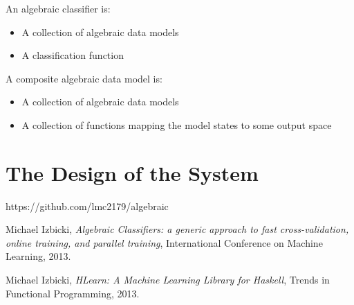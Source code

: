 \documentclass{article}
\begin{document}
\begin{mydef}
An algebraic classifier is:
\begin{itemize}  
    \item A collection of algebraic data models
    \item A classification function
\end{itemize}
\end{mydef}


\begin{mydef}
A composite algebraic data model is: 
\begin{itemize}  
    \item A collection of algebraic data models
    \item A collection of functions mapping the model states to some output space
\end{itemize}
\end{mydef}



\section{The Design of the System}

\begin{thebibliography}{9}

  https://github.com/lmc2179/algebraic
  
  Michael Izbicki,
  \emph{Algebraic Classifiers: a generic approach to fast cross-validation, online training, and parallel training},
    International Conference on Machine Learning,
  2013.

  Michael Izbicki,
  \emph{HLearn: A Machine Learning Library for Haskell},
  Trends in Functional Programming,
  2013.



\end{thebibliography}
\end{document}
